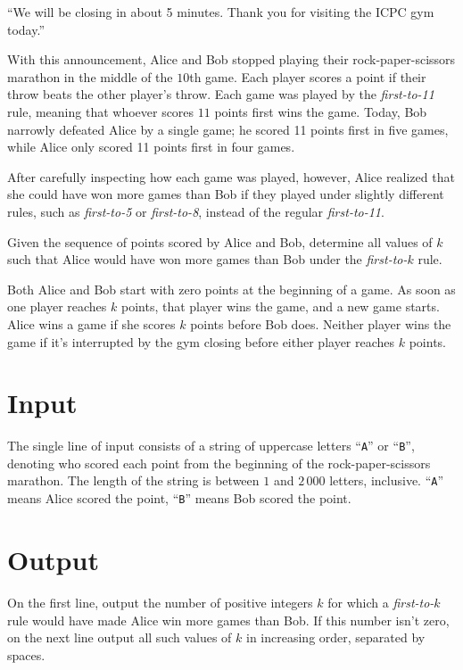 
``We will be closing in about 5 minutes. Thank you for visiting the ICPC gym today.''
\par
With this announcement, Alice and Bob stopped playing their rock-paper-scissors marathon
in the middle of the $10$th game. Each player scores a point if their throw beats the other player's throw. Each game was played by the \emph{first-to-11} rule, meaning that whoever scores $11$ points first wins the game.
Today, Bob narrowly defeated Alice by a single game; he scored 11 points first in five games, while Alice only scored 11 points first in four games.
\par
After carefully inspecting how each game was played, however, Alice realized that
she could have won more games than Bob if they played under slightly different rules, such as \emph{first-to-5} or \emph{first-to-8}, instead of the regular \emph{first-to-11}.
\par
Given the sequence of points scored by Alice and Bob, determine all values of $k$ such that
Alice would have won more games than Bob under the \emph{first-to-}$k$ rule.

Both Alice and Bob start with zero points at the beginning of a game. As soon as one player reaches $k$ points, that player wins the game, and a new game starts.
Alice wins a game if she scores $k$ points before Bob does. Neither player wins the game if it's interrupted by the gym closing before either player reaches $k$ points.

\section*{Input}

The single line of input consists of a string of uppercase letters ``\texttt{A}'' or ``\texttt{B}'', denoting who scored each point from the beginning of the rock-paper-scissors marathon. The length of the string is between $1$ and $2\,000$ letters, inclusive. ``\texttt{A}'' means Alice scored the point, ``\texttt{B}'' means Bob scored the point.

\section*{Output}

On the first line, output the number of positive integers $k$ for which a \emph{first-to-}$k$ rule would have made Alice win more games than Bob. If this number isn't zero, on the next line output all such values of $k$ in increasing order, separated by spaces.
